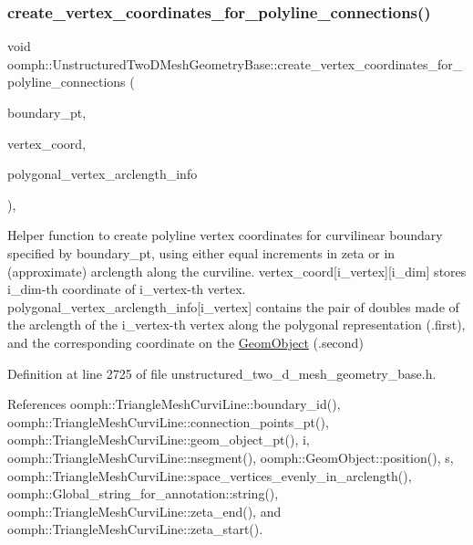 \subsubsection{\texorpdfstring{create\+\_\+vertex\+\_\+coordinates\+\_\+for\+\_\+polyline\+\_\+connections()}{create\_vertex\_coordinates\_for\_polyline\_connections()}}
{\footnotesize\ttfamily void oomph\+::\+Unstructured\+Two\+D\+Mesh\+Geometry\+Base\+::create\+\_\+vertex\+\_\+coordinates\+\_\+for\+\_\+polyline\+\_\+connections (\begin{DoxyParamCaption}\item[{\hyperlink{classoomph_1_1TriangleMeshCurviLine}{Triangle\+Mesh\+Curvi\+Line} $\ast$}]{boundary\+\_\+pt,  }\item[{\hyperlink{classoomph_1_1Vector}{Vector}$<$ \hyperlink{classoomph_1_1Vector}{Vector}$<$ double $>$ $>$ \&}]{vertex\+\_\+coord,  }\item[{\hyperlink{classoomph_1_1Vector}{Vector}$<$ std\+::pair$<$ double, double $>$ $>$ \&}]{polygonal\+\_\+vertex\+\_\+arclength\+\_\+info }\end{DoxyParamCaption})\hspace{0.3cm}{\ttfamily [inline]}, {\ttfamily [protected]}}



Helper function to create polyline vertex coordinates for curvilinear boundary specified by boundary\+\_\+pt, using either equal increments in zeta or in (approximate) arclength along the curviline. vertex\+\_\+coord\mbox{[}i\+\_\+vertex\mbox{]}\mbox{[}i\+\_\+dim\mbox{]} stores i\+\_\+dim-\/th coordinate of i\+\_\+vertex-\/th vertex. polygonal\+\_\+vertex\+\_\+arclength\+\_\+info\mbox{[}i\+\_\+vertex\mbox{]} contains the pair of doubles made of the arclength of the i\+\_\+vertex-\/th vertex along the polygonal representation (.first), and the corresponding coordinate on the \hyperlink{classoomph_1_1GeomObject}{Geom\+Object} (.second) 



Definition at line 2725 of file unstructured\+\_\+two\+\_\+d\+\_\+mesh\+\_\+geometry\+\_\+base.\+h.



References oomph\+::\+Triangle\+Mesh\+Curvi\+Line\+::boundary\+\_\+id(), oomph\+::\+Triangle\+Mesh\+Curvi\+Line\+::connection\+\_\+points\+\_\+pt(), oomph\+::\+Triangle\+Mesh\+Curvi\+Line\+::geom\+\_\+object\+\_\+pt(), i, oomph\+::\+Triangle\+Mesh\+Curvi\+Line\+::nsegment(), oomph\+::\+Geom\+Object\+::position(), s, oomph\+::\+Triangle\+Mesh\+Curvi\+Line\+::space\+\_\+vertices\+\_\+evenly\+\_\+in\+\_\+arclength(), oomph\+::\+Global\+\_\+string\+\_\+for\+\_\+annotation\+::string(), oomph\+::\+Triangle\+Mesh\+Curvi\+Line\+::zeta\+\_\+end(), and oomph\+::\+Triangle\+Mesh\+Curvi\+Line\+::zeta\+\_\+start().

